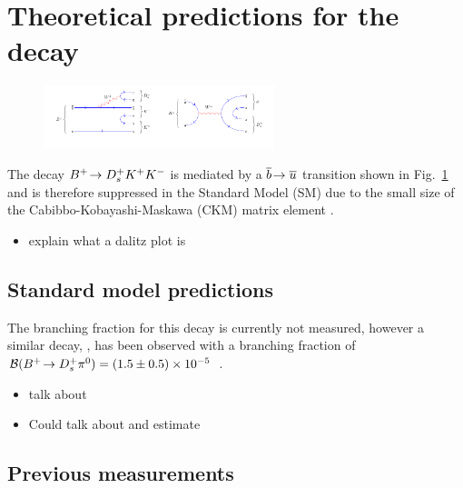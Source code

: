 \section{Theoretical predictions for the \decay{\Bp}{\Dsp\Kp\Km} decay}


\begin{figure}[!h]
    \centering
    \includegraphics[width=0.6\textwidth]{figs/Theory/B2DsKK.pdf}
    \caption{\decay{\Bp}{\Dsp\Kp\Km} }
    \label{fig:Theory_DsKKDiagram}   
\end{figure}



{\color{Blue}
The decay ${{{B}^+}}\!\rightarrow {\ensuremath{{D}^+_{s}}}{\ensuremath{{K}^+}}{\ensuremath{{K}^-}}$ is mediated by a ${\overline {{b}}}\!\rightarrow {\ensuremath{\overline {{u}}}}$ transition shown in Fig.~\ref{fig:Theory_DsKKDiagram} and is therefore suppressed in the Standard Model (SM) due to the small size of the Cabibbo-Kobayashi-Maskawa (CKM) matrix element \Vub. 
}


{\color{Red}
\begin{itemize}
\item explain what a dalitz plot is
\end{itemize}
}

\subsection{Standard model predictions}
{\color{Blue}
The branching fraction for this decay is currently not measured, however a similar decay, \decay{\Bp}{\Dsp \piz}, has been observed with a branching fraction of $\mathcal{B}({{{B}^+}}\!\rightarrow {\ensuremath{{D}^+_{s}}} {\ensuremath{{\pi}^0}}) = (1.5 \pm 0.5) \times 10^{-5}$~\cite{Aubert:2006xy}.
}


{\color{Red}
\begin{itemize}
\item talk about \decay{\Bp}{\Dsp\piz}
\item Could talk about \decay{\Bp}{\Dp\Kp\pim} and estimate   
\end{itemize}}

\subsection{Previous measurements}



